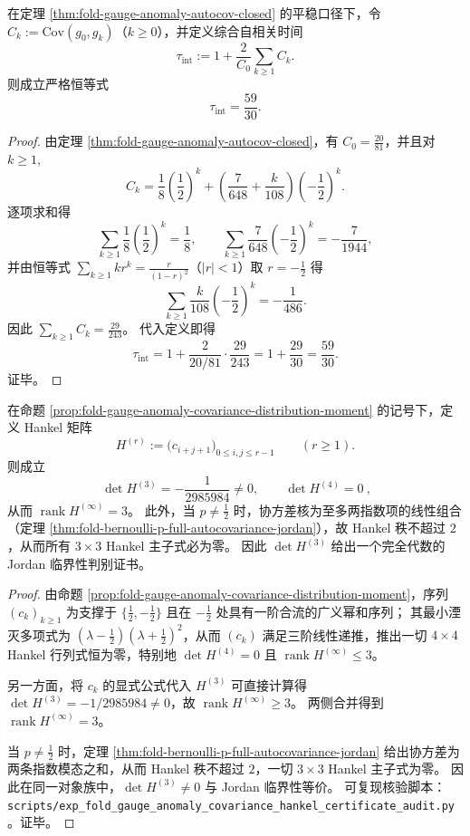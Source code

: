 \begin{proposition}[综合自相关时间的严格闭式]\label{prop:fold-gauge-anomaly-tau-int-closed}
在定理 \ref{thm:fold-gauge-anomaly-autocov-closed} 的平稳口径下，令
\(
C_k:=\mathrm{Cov}(g_0,g_k)
\)（\(k\ge 0\)），并定义综合自相关时间
\[
\tau_{\mathrm{int}}
:=
1+\frac{2}{C_0}\sum_{k\ge 1}C_k.
\]
则成立严格恒等式
\[
\boxed{\;\tau_{\mathrm{int}}=\frac{59}{30}.\;}
\]
\end{proposition}
\begin{proof}
由定理 \ref{thm:fold-gauge-anomaly-autocov-closed}，有 \(C_0=\frac{20}{81}\)，并且对 \(k\ge 1\),
\[
C_k=\frac18\left(\frac12\right)^k+\left(\frac{7}{648}+\frac{k}{108}\right)\left(-\frac12\right)^k.
\]
逐项求和得
\[
\sum_{k\ge 1}\frac18\left(\frac12\right)^k=\frac18,
\qquad
\sum_{k\ge 1}\frac{7}{648}\left(-\frac12\right)^k=-\frac{7}{1944},
\]
并由恒等式 \(\sum_{k\ge 1}kr^k=\frac{r}{(1-r)^2}\)（\(|r|<1\)）取 \(r=-\frac12\) 得
\[
\sum_{k\ge 1}\frac{k}{108}\left(-\frac12\right)^k=-\frac{1}{486}.
\]
因此
\(
\sum_{k\ge 1}C_k=\frac{29}{243}
\)。
代入定义即得
\[
\tau_{\mathrm{int}}
=1+\frac{2}{20/81}\cdot\frac{29}{243}
=1+\frac{29}{30}
=\frac{59}{30}.
\]
证毕。
\end{proof}

\begin{theorem}\label{thm:fold-gauge-anomaly-hankel-jordan-certificate}
在命题 \ref{prop:fold-gauge-anomaly-covariance-distribution-moment} 的记号下，定义 Hankel 矩阵
\[
H^{(r)}:=\bigl(c_{i+j+1}\bigr)_{0\le i,j\le r-1}\qquad(r\ge 1).
\]
则成立
\[
\boxed{\ \det H^{(3)}=-\frac{1}{2985984}\neq 0,\qquad \det H^{(4)}=0\ },
\]
从而 \(\operatorname{rank}H^{(\infty)}=3\)。
此外，当 \(p\neq\tfrac12\) 时，协方差核为至多两指数项的线性组合（定理 \ref{thm:fold-bernoulli-p-full-autocovariance-jordan}），故 Hankel 秩不超过 \(2\)，从而所有 \(3\times 3\) Hankel 主子式必为零。
因此 \(\det H^{(3)}\) 给出一个完全代数的 Jordan 临界性判别证书。
\end{theorem}

\begin{proof}
由命题 \ref{prop:fold-gauge-anomaly-covariance-distribution-moment}，序列 \((c_k)_{k\ge 1}\) 为支撑于 \(\{\tfrac12,-\tfrac12\}\) 且在 \(-\tfrac12\) 处具有一阶合流的广义幂和序列；
其最小湮灭多项式为 \((\lambda-\tfrac12)(\lambda+\tfrac12)^2\)，从而 \((c_k)\) 满足三阶线性递推，推出一切 \(4\times 4\) Hankel 行列式恒为零，特别地 \(\det H^{(4)}=0\) 且 \(\operatorname{rank}H^{(\infty)}\le 3\)。
\par
另一方面，将 \(c_k\) 的显式公式代入 \(H^{(3)}\) 可直接计算得 \(\det H^{(3)}=-1/2985984\neq 0\)，故 \(\operatorname{rank}H^{(\infty)}\ge 3\)。
两侧合并得到 \(\operatorname{rank}H^{(\infty)}=3\)。
\par
当 \(p\neq\tfrac12\) 时，定理 \ref{thm:fold-bernoulli-p-full-autocovariance-jordan} 给出协方差为两条指数模态之和，从而 Hankel 秩不超过 \(2\)，一切 \(3\times 3\) Hankel 主子式为零。
因此在同一对象族中，\(\det H^{(3)}\neq 0\) 与 Jordan 临界性等价。
可复现核验脚本：\texttt{scripts/exp\_fold\_gauge\_anomaly\_covariance\_hankel\_certificate\_audit.py}。证毕。
\end{proof}

\endinput
